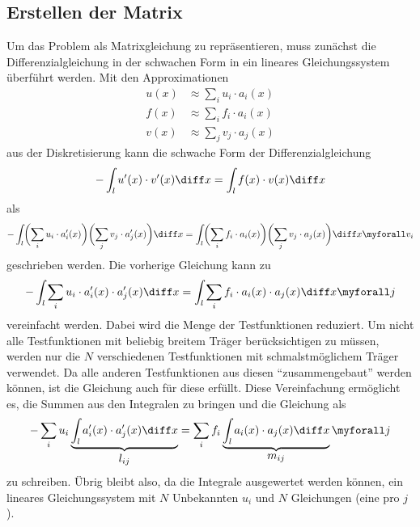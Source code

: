 \subsection{Erstellen der Matrix\label{fem:1d:matrix_erstellen}}
Um das Problem als Matrixgleichung zu repräsentieren, muss zunächst die Differenzialgleichung in der schwachen Form in ein lineares Gleichungssystem überführt werden.
Mit den Approximationen 
\begin{align*}
    u(x) &\approx \sum_i u_i \cdot a_i(x) \\
    f(x) &\approx \sum_i f_i \cdot a_i(x) \\
    v(x) &\approx \sum_j v_j \cdot a_j(x)
\end{align*}
aus der Diskretisierung kann die schwache Form der Differenzialgleichung 
\begin{equation*}
    - \int_l u'(x) \cdot v'(x) \diff x = \int_l f(x) \cdot v(x) \diff x
\end{equation*}
als
\begin{equation*}
    - \int_l \biggl(\sum_i u_i \cdot a'_i(x)\biggr) \biggl(\sum_j v_j \cdot a'_j(x)\biggr) \diff x 
    = \int_l \biggl(\sum_i f_i \cdot a_i(x) \biggr) \biggl(\sum_j v_j \cdot a_j(x) \biggr) \diff x 
    \myforall v_i
\end{equation*}
geschrieben werden.
Die vorherige Gleichung kann zu
\begin{equation*}
    - \int_l \sum_i u_i \cdot a'_i(x) \cdot a'_j(x) \diff x = \int_l \sum_i f_i \cdot a_i(x) \cdot a_j(x) \diff x \myforall j
\end{equation*}
vereinfacht werden.
Dabei wird die Menge der Testfunktionen reduziert.
Um nicht alle Testfunktionen mit beliebig breitem Träger berücksichtigen zu müssen, werden nur die $N$ verschiedenen Testfunktionen mit schmalstmöglichem Träger verwendet.
Da alle anderen Testfunktionen aus diesen ``zusammengebaut'' werden können, ist die Gleichung auch für diese erfüllt.
Diese Vereinfachung ermöglicht es, die Summen aus den Integralen zu bringen und die Gleichung als
\begin{equation}
    - \sum_i u_i \underbrace{\int_l a'_i(x) \cdot a'_j(x) \diff x}_{\displaystyle l_{ij}} = \sum_i f_i \underbrace{\int_l a_i(x) \cdot a_j(x) \diff x}_{\displaystyle m_{ij}} \myforall j \label{papers:fem:prinzip1d:finale_gleichung}
\end{equation}
zu schreiben.
Übrig bleibt also, da die Integrale ausgewertet werden können, ein lineares Gleichungssystem mit $N$ Unbekannten $u_i$ und $N$ Gleichungen (eine pro $j$). 


